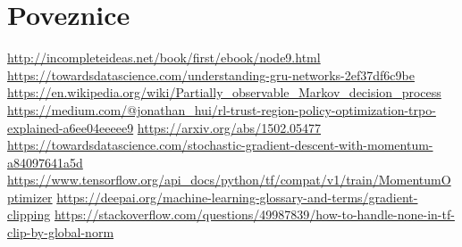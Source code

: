 \section{Poveznice}
\url{http://incompleteideas.net/book/first/ebook/node9.html}
\url{https://towardsdatascience.com/understanding-gru-networks-2ef37df6c9be}
\url{https://en.wikipedia.org/wiki/Partially_observable_Markov_decision_process}
\url{https://medium.com/@jonathan_hui/rl-trust-region-policy-optimization-trpo-explained-a6ee04eeeee9}
\url{https://arxiv.org/abs/1502.05477}
\url{https://towardsdatascience.com/stochastic-gradient-descent-with-momentum-a84097641a5d}
\url{https://www.tensorflow.org/api_docs/python/tf/compat/v1/train/MomentumOptimizer}
\url{https://deepai.org/machine-learning-glossary-and-terms/gradient-clipping}
\url{https://stackoverflow.com/questions/49987839/how-to-handle-none-in-tf-clip-by-global-norm}

